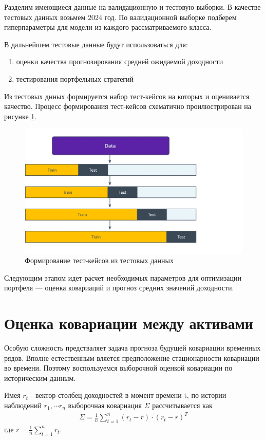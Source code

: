 Разделим имеющиеся данные на валидационную и тестовую выборки. В качестве тестовых данных возьмем 2024 год.
По валидационной выборке подберем гиперпараметры для модели из каждого рассматриваемого класса.

В дальнейшем тестовые данные будут использоваться для:
\begin{enumerate}
	\item оценки качества прогнозирования средней ожидаемой доходности
	\item тестирования портфельных стратегий
\end{enumerate}

Из тестовых днных формируется набор тест-кейсов на которых и оценивается качество.
Процесс формирования тест-кейсов схематично проилюстрирован на рисунке \ref{fig:ts_csv}.
\begin{figure}[H]
	\centering
	\includegraphics[width=\textwidth]{images/ts_cv}
	\caption{Формирование тест-кейсов из тестовых данных}
	\label{fig:ts_csv}
\end{figure}

Следующим этапом идет расчет необходимых параметров для оптимизации портфеля --- 
оценка ковариаций и прогноз средних значений доходности.

\section{Оценка ковариации между активами}

Особую сложность предстваляет задача прогноза будущей ковариации временных рядов. 
Вполне естественным вляется предположение стационарности ковариации во времени. 
Поэтому воспользуемся выборочной оценкой ковариации по историческим данным.

Имея $r_t$ - вектор-столбец доходностей в момент времени t, по истории наблюдений $r_1, \cdots r_n$ 
выборочная ковариация $\Sigma$ рассчитывается как 
\begin{align}
	\Sigma = \frac{1}{n} \sum_{t=1}^{n}(r_t - \overline{r}) \cdot (r_t - \overline{r})^T
\end{align}
где $\overline{r} = \frac{1}{n} \sum_{t=1}^{n} r_t$.

